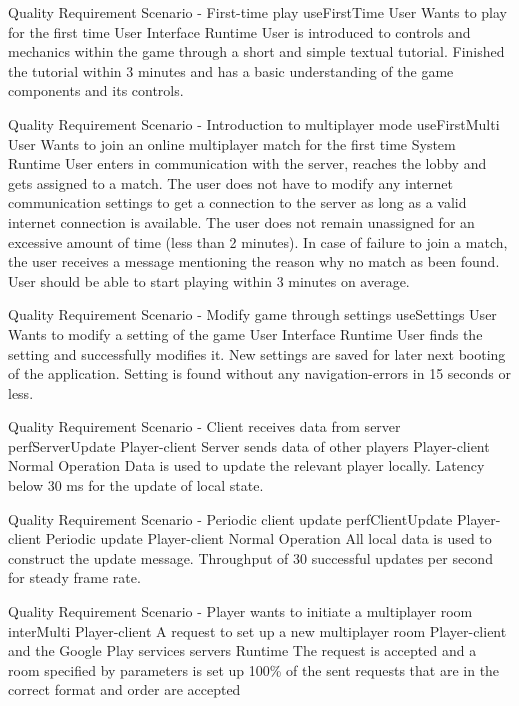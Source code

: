 
{Quality Requirement Scenario - First-time play}
{useFirstTime}
{User}
{Wants to play for the first time}
{User Interface}
{Runtime}
{User is introduced to controls and mechanics within the game through
a short and simple textual tutorial.}
{Finished the tutorial within 3 minutes and has a basic understanding of the game components and its controls.}

{Quality Requirement Scenario - Introduction to multiplayer mode}
{useFirstMulti}
{User}
{Wants to join an online multiplayer match for the first time}
{System}
{Runtime}
{User enters in communication with the server, reaches the lobby and gets assigned to a match.}
{The user does not have to modify any internet communication settings to get a connection to the server as long as a valid internet connection is available. The user does not remain unassigned for an excessive amount of time (less than 2 minutes). In case of failure to join a match, the user receives a message mentioning the reason why no match as been found. User should be able to start playing within 3 minutes on average.}

{Quality Requirement Scenario - Modify game through settings}
{useSettings}
{User}
{Wants to modify a setting of the game}
{User Interface}
{Runtime}
{User finds the setting and successfully modifies it. New settings are saved for later next booting of the application.}
{Setting is found without any navigation-errors in 15 seconds or less.}


{Quality Requirement Scenario - Client receives data from server}
{perfServerUpdate}
{Player-client}
{Server sends data of other players}
{Player-client}
{Normal Operation}
{Data is used to update the relevant player locally.}
{Latency below 30 ms for the update of local state.}

{Quality Requirement Scenario - Periodic client update}
{perfClientUpdate}
{Player-client}
{Periodic update}
{Player-client}
{Normal Operation}
{All local data is used to construct the update message.}
{Throughput of 30 successful updates per second for steady frame rate.}


{Quality Requirement Scenario - Player wants to initiate a multiplayer room}
{interMulti}
{Player-client}
{A request to set up a new multiplayer room}
{Player-client and the Google Play services servers}
{Runtime}
{The request is accepted and a room specified by parameters is set up}
{100\% of the sent requests that are in the correct format and order are accepted}
